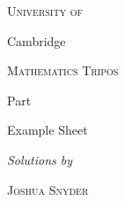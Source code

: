 \begin{titlepage}
  \begin{center}
    \vspace{2cm}
    {\scshape\huge University of \par
      \Huge Cambridge \par}
    \vspace{1cm}
    {\scshape\huge Mathematics Tripos \par}
    \vspace{2cm}
    {\huge Part \npart \par}
    \vspace{0.6cm}
    {\Huge \bfseries \ntitle \par}
    \vspace{0.6cm}
    {\huge Example Sheet \nsheet \par}
    \vspace{1.2cm}
    {\Large\ndate \par}
    \vspace{2cm}
    
    {\large \emph{Solutions by } \par}
    \vspace{0.2cm}
    {\Large \scshape Joshua Snyder}
 \end{center}
\end{titlepage}
